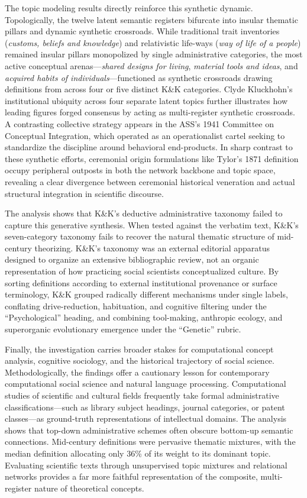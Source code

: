 \documentclass[11pt]{article}
\begin{document}
The topic modeling results directly reinforce this synthetic dynamic. Topologically, the twelve latent semantic registers bifurcate into insular thematic pillars and dynamic synthetic crossroads. While traditional trait inventories (\emph{customs, beliefs and knowledge}) and relativistic life-ways (\emph{way of life of a people}) remained insular pillars monopolized by single administrative categories, the most active conceptual arenas---\emph{shared designs for living}, \emph{material tools and ideas}, and \emph{acquired habits of individuals}---functioned as synthetic crossroads drawing definitions from across four or five distinct K\&K categories. Clyde Kluckhohn's institutional ubiquity across four separate latent topics further illustrates how leading figures forged consensus by acting as multi-register synthetic crossroads. A contrasting collective strategy appears in the ASS's 1941 Committee on Conceptual Integration, which operated as an operationalist cartel seeking to standardize the discipline around behavioral end-products. In sharp contrast to these synthetic efforts, ceremonial origin formulations like Tylor's 1871 definition occupy peripheral outposts in both the network backbone and topic space, revealing a clear divergence between ceremonial historical veneration and actual structural integration in scientific discourse.

The analysis shows that K\&K's deductive administrative taxonomy failed to capture this generative synthesis. When tested against the verbatim text, K\&K's seven-category taxonomy fails to recover the natural thematic structure of mid-century theorizing. K\&K's taxonomy was an external editorial apparatus designed to organize an extensive bibliographic review, not an organic representation of how practicing social scientists conceptualized culture. By sorting definitions according to external institutional provenance or surface terminology, K\&K grouped radically different mechanisms under single labels, conflating drive-reduction, habituation, and cognitive filtering under the ``Psychological'' heading, and combining tool-making, anthropic ecology, and superorganic evolutionary emergence under the ``Genetic'' rubric.

Finally, the investigation carries broader stakes for computational concept analysis, cognitive sociology, and the historical trajectory of social science. Methodologically, the findings offer a cautionary lesson for contemporary computational social science and natural language processing. Computational studies of scientific and cultural fields frequently take formal administrative classifications---such as library subject headings, journal categories, or patent classes---as ground-truth representations of intellectual domains. The analysis shows that top-down administrative schemes often obscure bottom-up semantic connections. Mid-century definitions were pervasive thematic mixtures, with the median definition allocating only 36\% of its weight to its dominant topic. Evaluating scientific texts through unsupervised topic mixtures and relational networks provides a far more faithful representation of the composite, multi-register nature of theoretical concepts.
\end{document}
